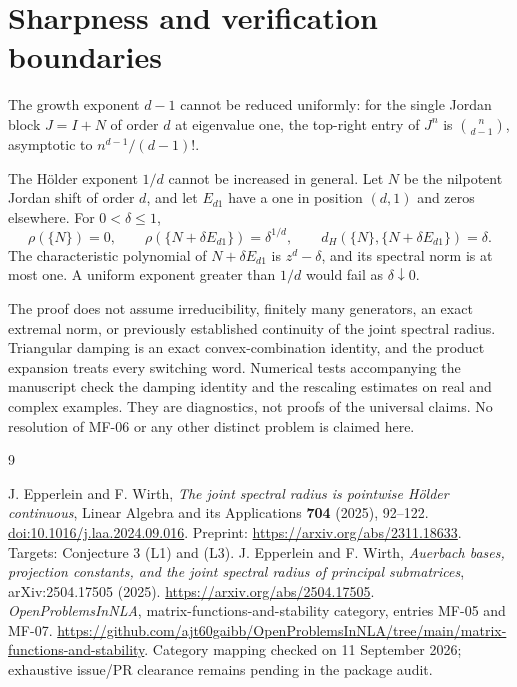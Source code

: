 \documentclass[11pt]{article}
\theoremstyle{remark}\newtheorem{remark}[theorem]{Remark}
\begin{document}
\section{Sharpness and verification boundaries}
The growth exponent $d-1$ cannot be reduced uniformly: for the single Jordan block $J=I+N$ of order $d$ at eigenvalue one, the top-right entry of $J^n$ is $\binom n{d-1}$, asymptotic to $n^{d-1}/(d-1)!$.

The H\"older exponent $1/d$ cannot be increased in general. Let $N$ be the nilpotent Jordan shift of order $d$, and let $E_{d1}$ have a one in position $(d,1)$ and zeros elsewhere. For $0<\delta\leq1$,
\[
 \rho(\{N\})=0,\qquad
 \rho(\{N+\delta E_{d1}\})=\delta^{1/d},\qquad
 d_H(\{N\},\{N+\delta E_{d1}\})=\delta.
\]
The characteristic polynomial of $N+\delta E_{d1}$ is $z^d-\delta$, and its spectral norm is at most one. A uniform exponent greater than $1/d$ would fail as $\delta\downarrow0$.

The proof does not assume irreducibility, finitely many generators, an exact extremal norm, or previously established continuity of the joint spectral radius. Triangular damping is an exact convex-combination identity, and the product expansion treats every switching word. Numerical tests accompanying the manuscript check the damping identity and the rescaling estimates on real and complex examples. They are diagnostics, not proofs of the universal claims. No resolution of MF-06 or any other distinct problem is claimed here.

\begin{thebibliography}{9}\raggedright
{}
J. Epperlein and F. Wirth,
\emph{The joint spectral radius is pointwise H\"older continuous},
Linear Algebra and its Applications \textbf{704} (2025), 92--122.
\href{https://doi.org/10.1016/j.laa.2024.09.016}{doi:10.1016/j.laa.2024.09.016}.
Preprint: \url{https://arxiv.org/abs/2311.18633}.
Targets: Conjecture 3 (L1) and (L3).
J. Epperlein and F. Wirth,
\emph{Auerbach bases, projection constants, and the joint spectral radius of principal submatrices},
arXiv:2504.17505 (2025).
\url{https://arxiv.org/abs/2504.17505}.
\emph{OpenProblemsInNLA}, matrix-functions-and-stability category, entries MF-05 and MF-07.
\url{https://github.com/ajt60gaibb/OpenProblemsInNLA/tree/main/matrix-functions-and-stability}.
Category mapping checked on 11 September 2026; exhaustive issue/PR clearance remains pending in the package audit.
\end{thebibliography}
\end{document}
